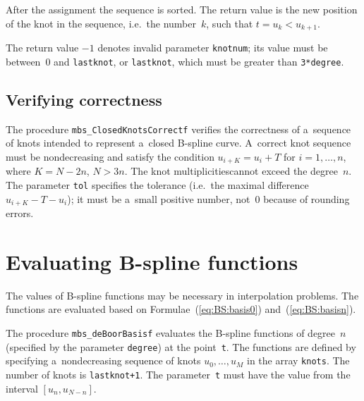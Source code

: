 After the assignment the sequence is sorted. The return value is   
the new position of the knot in the sequence, i.e.\ the number~$k$,
such that $t=u_k<u_{k+1}$.

The return value $-1$ denotes invalid parameter \texttt{knotnum};
its value must be between~$0$ and \texttt{lastknot}, or \texttt{lastknot},
which must be greater than \texttt{3*degree}.


\vspace{\bigskipamount}

\subsection{Verifying correctness}

The procedure \texttt{mbs\_ClosedKnotsCorrectf} verifies the correctness
of a~sequence of knots intended to represent a~closed B-spline curve.
A~correct knot sequence must be nondecreasing and satisfy the condition
$u_{i+K}=u_i+T$ for $i=1,\ldots,n$, where $K=N-2n$, $N>3n$. The knot
multiplicitiescannot exceed the degree~$n$. The parameter \texttt{tol}
specifies the tolerance (i.e.\ the maximal difference $u_{i+K}-T-u_i$);
it must be a~small positive number, not~$0$ because of rounding errors.


\newpage
\section{Evaluating B-spline functions}

The values of B-spline functions may be necessary in interpolation problems.
The functions are evaluated based on Formulae~(\ref{eq:BS:basis0})
and~(\ref{eq:BS:basisn}).

\vspace{\bigskipamount}

\begin{sloppypar}
The procedure \texttt{mbs\_deBoorBasisf} evaluates the B-spline functions
of degree~$n$ (specified by the parameter \texttt{degree}) at the
point~\texttt{t}. The functions are defined by specifying a~nondecreasing
sequence of knots $u_0,\ldots,u_M$ in the array \texttt{knots}.
The number of knots is \texttt{lastknot+1}.
The parameter~\texttt{t} must have the value from the interval
$[u_n,u_{N-n}]$.
\end{sloppypar}

